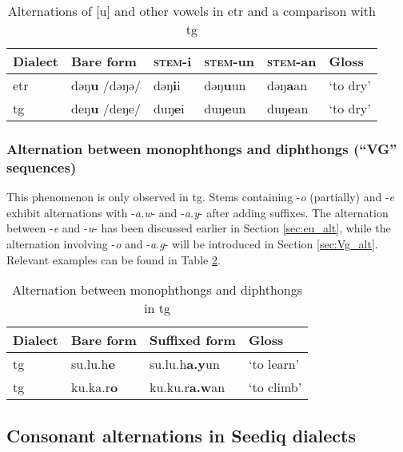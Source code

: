 \begin{table}[!htbp]
\centering
\caption{Alternations of [u] and other vowels in \acl{etr} and a comparison with \acl{tg}}
\label{tab:eu_alt_special}
\begin{tabular}{llllll}
\hline
Dialect   & Bare form & \textsc{stem}-i & \textsc{stem}-un & \textsc{stem}-an & Gloss    \\ \hline
\acl{etr} & dəŋ\textbf{u} /dəŋə/      & dəŋ\textbf{i}i   & dəŋ\textbf{u}un   & dəŋ\textbf{a}an   & `to dry' \\
\acl{tg}  & deŋ\textbf{u} /deŋe/      & duŋ\textbf{e}i   & duŋ\textbf{e}un   & duŋ\textbf{e}an   & `to dry' \\ \hline
\end{tabular}
\end{table}

\subsubsection{Alternation between monophthongs and diphthongs (``VG'' sequences)}

This phenomenon is only observed in \acl{tg}. Stems containing -\textit{o} (partially) and -\textit{e} exhibit alternations with -\textit{a.w}- and -\textit{a.y}- after adding suffixes. The alternation between -\textit{e} and -\textit{u}- has been discussed earlier in Section \ref{sec:eu_alt}, while the alternation involving -\textit{o} and -\textit{a.g}- will be introduced in Section \ref{sec:Vg_alt}. Relevant examples can be found in Table \ref{tab:oeaway_alt}.

\begin{table}[!htbp]
\centering
\caption{Alternation between monophthongs and diphthongs in \acl{tg}}
\label{tab:oeaway_alt}
\begin{tabular}{llll}
\hline
Dialect  & Bare form & Suffixed form & Gloss      \\ \hline
\acl{tg} & su.lu.h\textbf{e}  & su.lu.h\textbf{a.y}un  & `to learn' \\
\acl{tg} & ku.ka.r\textbf{o}  & ku.ku.r\textbf{a.w}an  & `to climb' \\ \hline
\end{tabular}
\end{table}

\subsection{Consonant alternations in Seediq dialects}

